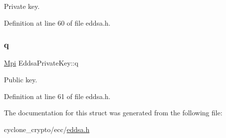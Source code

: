 Private key. 



Definition at line 60 of file eddsa.\+h.

\mbox{\label{structEddsaPrivateKey_a8c25f892d557d9dbff5ddb01dd23a78d}} 
\subsubsection{\texorpdfstring{q}{q}}
{\footnotesize\ttfamily \hyperlink{structMpi}{Mpi} Eddsa\+Private\+Key\+::q}



Public key. 



Definition at line 61 of file eddsa.\+h.



The documentation for this struct was generated from the following file\+:\begin{DoxyCompactItemize}
\item 
cyclone\+\_\+crypto/ecc/\hyperlink{eddsa_8h}{eddsa.\+h}\end{DoxyCompactItemize}

